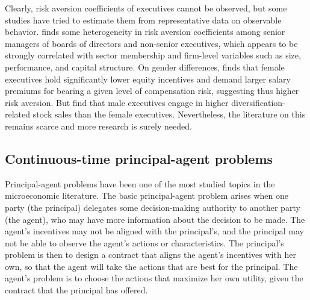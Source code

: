     Clearly, risk aversion coefficients of executives cannot be observed, but some studies have tried to estimate them from representative data on observable behavior. \citet{brenner2015risk} finds some heterogeneity in risk aversion coefficients among senior managers of boards of directors and non-senior executives, which appears to be strongly correlated with sector membership and firm-level variables such as size, performance, and capital structure. On gender differences, \citet{carter2017executive} finds that female executives hold significantly lower equity incentives and demand larger salary premiums for bearing a given level of compensation risk, suggesting thus higher risk aversion. But \citet{iqbal2006female} find that male executives engage in higher diversification-related stock sales than the female executives. Nevertheless, the literature on this remains scarce and more research is surely needed.

\subsection{Continuous-time principal-agent problems} 
    Principal-agent problems have been one of the most studied topics in the microeconomic literature. The basic principal-agent problem arises when one party (the principal) delegates some decision-making authority to another party (the agent), who may have more information about the decision to be made. The agent's incentives may not be aligned with the principal's, and the principal may not be able to observe the agent's actions or characteristics. The principal's problem is then to design a contract that aligns the agent's incentives with her own, so that the agent will take the actions that are best for the principal. The agent's problem is to choose the actions that maximize her own utility, given the contract that the principal has offered. 

